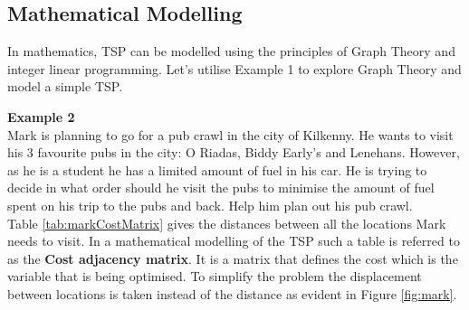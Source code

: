\documentclass[a4paper]{article}
\begin{document}
\subsection{Mathematical Modelling}
In mathematics, TSP can be modelled using the principles of Graph Theory and integer linear programming. Let's utilise Example 1 to explore Graph Theory and model a simple TSP.
\begin{displayquote}
    \textbf{Example 2}\\
    Mark is planning to go for a pub crawl in the city of Kilkenny. He wants to visit his 3 favourite pubs in the city: O Riadas, Biddy Early's and Lenehans. However, as he is a student he has a limited amount of fuel in his car. He is trying to decide in what order should he visit the pubs to minimise the amount of fuel spent on his trip to the pubs and back. Help him plan out his pub crawl. \\
    Table \ref{tab:markCostMatrix} gives the distances between all the locations Mark needs to visit. In a mathematical modelling of the TSP such a table is referred to as the \textbf{Cost adjacency matrix}. It is a matrix that defines the cost which is the variable that is being optimised. To simplify the problem the displacement between locations is taken instead of the distance as evident in Figure \ref{fig:mark}.


\end{displayquote}
\end{document}
